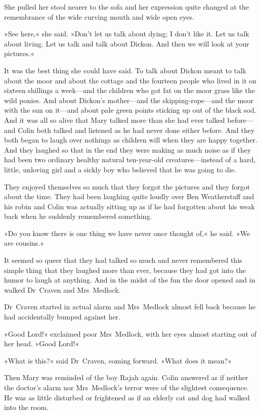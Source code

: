 She pulled her stool nearer to the sofa and her expression quite changed at the remembrance of the wide curving mouth and wide open eyes.

»See here,« she said. »Don't let us talk about dying; I don't like it. Let us talk about living. Let us talk and talk about Dickon. And then we will look at your pictures.«

It was the best thing she could have said. To talk about Dickon meant to talk about the moor and about the cottage and the fourteen people who lived in it on sixteen shillings a week—and the children who got fat on the moor grass like the wild ponies. And about Dickon's mother—and the skipping-rope—and the moor with the sun on it—and about pale green points sticking up out of the black sod. And it was all so alive that Mary talked more than she had ever talked before—and Colin both talked and listened as he had never done either before. And they both began to laugh over nothings as children will when they are happy together. And they laughed so that in the end they were making as much noise as if they had been two ordinary healthy natural ten-year-old creatures—instead of a hard, little, unloving girl and a sickly boy who believed that he was going to die.

They enjoyed themselves so much that they forgot the pictures and they forgot about the time. They had been laughing quite loudly over Ben Weatherstaff and his robin and Colin was actually sitting up as if he had forgotten about his weak back when he suddenly remembered something.

»Do you know there is one thing we have never once thought of,« he said. »We are cousins.«

It seemed so queer that they had talked so much and never remembered this simple thing that they laughed more than ever, because they had got into the humor to laugh at anything. And in the midst of the fun the door opened and in walked Dr~Craven and Mrs~Medlock.

Dr~Craven started in actual alarm and Mrs~Medlock almost fell back because he had accidentally bumped against her.

»Good Lord!« exclaimed poor Mrs~Medlock, with her eyes almost starting out of her head. »Good Lord!«

»What is this?« said Dr~Craven, coming forward. »What does it mean?«

Then Mary was reminded of the boy Rajah again. Colin answered as if neither the doctor's alarm nor Mrs~Medlock's terror were of the slightest consequence. He was as little disturbed or frightened as if an elderly cat and dog had walked into the room.

